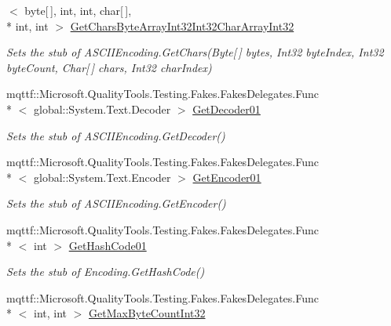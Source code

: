 \begin{DoxyCompactItemize}
$<$ byte\mbox{[}$\,$\mbox{]}, int, int, char\mbox{[}$\,$\mbox{]}, \\*
int, int $>$ \hyperlink{class_system_1_1_text_1_1_fakes_1_1_stub_a_s_c_i_i_encoding_a5cd12e29508a1f1bdac6e2b35f59ba21}{Get\-Chars\-Byte\-Array\-Int32\-Int32\-Char\-Array\-Int32}
\begin{DoxyCompactList}\small\item\em Sets the stub of A\-S\-C\-I\-I\-Encoding.\-Get\-Chars(\-Byte\mbox{[}$\,$\mbox{]} bytes, Int32 byte\-Index, Int32 byte\-Count, Char\mbox{[}$\,$\mbox{]} chars, Int32 char\-Index)\end{DoxyCompactList}\item 
mqttf\-::\-Microsoft.\-Quality\-Tools.\-Testing.\-Fakes.\-Fakes\-Delegates.\-Func\\*
$<$ global\-::\-System.\-Text.\-Decoder $>$ \hyperlink{class_system_1_1_text_1_1_fakes_1_1_stub_a_s_c_i_i_encoding_ae6aae5586f06bd1278a3f6c0851dbeb7}{Get\-Decoder01}
\begin{DoxyCompactList}\small\item\em Sets the stub of A\-S\-C\-I\-I\-Encoding.\-Get\-Decoder()\end{DoxyCompactList}\item 
mqttf\-::\-Microsoft.\-Quality\-Tools.\-Testing.\-Fakes.\-Fakes\-Delegates.\-Func\\*
$<$ global\-::\-System.\-Text.\-Encoder $>$ \hyperlink{class_system_1_1_text_1_1_fakes_1_1_stub_a_s_c_i_i_encoding_a31409111551c1581bc1deca18478240b}{Get\-Encoder01}
\begin{DoxyCompactList}\small\item\em Sets the stub of A\-S\-C\-I\-I\-Encoding.\-Get\-Encoder()\end{DoxyCompactList}\item 
mqttf\-::\-Microsoft.\-Quality\-Tools.\-Testing.\-Fakes.\-Fakes\-Delegates.\-Func\\*
$<$ int $>$ \hyperlink{class_system_1_1_text_1_1_fakes_1_1_stub_a_s_c_i_i_encoding_ac5d32b99f5be4b076207721f991a1c17}{Get\-Hash\-Code01}
\begin{DoxyCompactList}\small\item\em Sets the stub of Encoding.\-Get\-Hash\-Code()\end{DoxyCompactList}\item 
mqttf\-::\-Microsoft.\-Quality\-Tools.\-Testing.\-Fakes.\-Fakes\-Delegates.\-Func\\*
$<$ int, int $>$ \hyperlink{class_system_1_1_text_1_1_fakes_1_1_stub_a_s_c_i_i_encoding_a43b17804649a6a80b2a51c9955222c86}{Get\-Max\-Byte\-Count\-Int32}

\end{DoxyCompactItemize}
